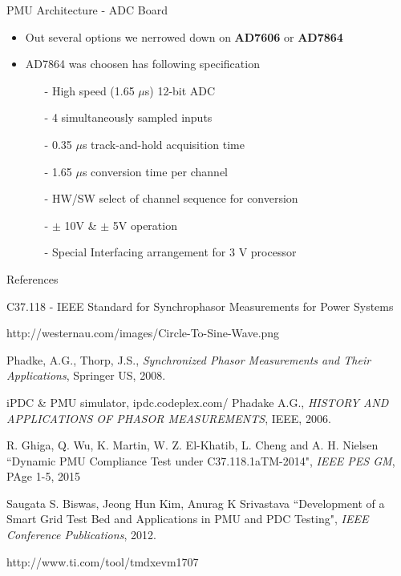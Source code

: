 \documentclass{beamer}
\begin{document}
\begin{frame}{PMU Architecture - ADC Board}

\begin{itemize}
\item Out several options we nerrowed down on \textbf{AD7606} or \textbf{AD7864}
\item AD7864 was choosen has following specification
\begin{itemize}
	\item[-] High speed (1.65 $\mu$s) 12-bit ADC 
	\item[-] 4 simultaneously sampled inputs
	\item[-] 0.35 $\mu$s track-and-hold acquisition time 
	\item[-] 1.65 $\mu$s conversion time per channel 
	\item[-] HW/SW select of channel sequence for conversion 
	\item[-] $\pm$ 10V \& $\pm$ 5V operation
	\item[-] Special Interfacing arrangement for 3 V processor 
\end{itemize} 
\end{itemize}
\end{frame}

    \begin{frame}{References}
\begin{thebibliography}{1}
	\tiny
	
	 C37.118 - IEEE Standard for Synchrophasor Measurements for Power Systems
	
	http://westernau.com/images/Circle-To-Sine-Wave.png
	
	Phadke, A.G., Thorp, J.S.,  \textit{Synchronized Phasor Measurements and Their Applications}, Springer US, 2008.
	
	iPDC \& PMU simulator, ipdc.codeplex.com/ 
	Phadake A.G., \textit{HISTORY AND APPLICATIONS OF PHASOR MEASUREMENTS}, IEEE, 2006.
	
	
	R. Ghiga, Q. Wu, K. Martin, W. Z. El-Khatib, L. Cheng and A. H. Nielsen ``Dynamic PMU Compliance Test under C37.118.1aTM-2014", \textit{IEEE PES GM}, PAge 1-5, 2015
	
	Saugata S. Biswas, Jeong Hun Kim, Anurag K Srivastava ``Development of a Smart Grid Test Bed and Applications in PMU and PDC Testing", \textit{IEEE Conference Publications}, 2012.	
	
	http://www.ti.com/tool/tmdxevm1707

\end{thebibliography}
    \end{frame}
\end{document}
